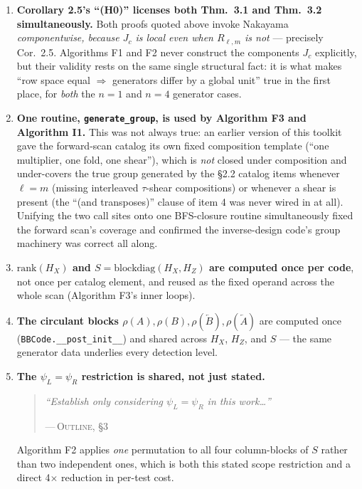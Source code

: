 \documentclass[11pt]{article}
\theoremstyle{plain}
\theoremstyle{definition}
\newenvironment{paperquote}[1]{%
  \def\paperquotecite{#1}%
  \begin{quotation}\noindent\itshape\small
}{%
  \normalfont\par\hfill---\,\textsc{Outline}, \paperquotecite\medskip
  \end{quotation}
}
\newcommand{\pq}[2]{\begin{paperquote}{#1}#2\end{paperquote}}
\begin{document}
\begin{enumerate}[leftmargin=*]

\item \textbf{Corollary 2.5's ``(H0)'' licenses both Thm.\ 3.1 and Thm.\
3.2 simultaneously.} Both proofs quoted above invoke Nakayama
\emph{componentwise, because $J_c$ is local even when $R_{\ell,m}$ is not}
--- precisely Cor.\ 2.5. Algorithms F1 and F2 never construct the
components $J_c$ explicitly, but their validity rests on the same single
structural fact: it is what makes ``row space equal $\Rightarrow$ generators
differ by a global unit'' true in the first place, for \emph{both} the
$n=1$ and $n=4$ generator cases.

\item \textbf{One routine, \texttt{generate\_group}, is used by Algorithm
F3 and Algorithm I1.} This was not always true: an earlier version of this
toolkit gave the forward-scan catalog its own fixed composition template
(``one multiplier, one fold, one shear''), which is \emph{not} closed under
composition and under-covers the true group generated by the \S2.2 catalog
items whenever $\ell=m$ (missing interleaved $\tau$-shear compositions) or
whenever a shear is present (the ``(and transposes)'' clause of item 4 was
never wired in at all). Unifying the two call sites onto one BFS-closure
routine simultaneously fixed the forward scan's coverage and confirmed the
inverse-design code's group machinery was correct all along.

\item \textbf{$\mathrm{rank}(H_X)$ and $S=\mathrm{blockdiag}(H_X,H_Z)$ are
computed once per code}, not once per catalog element, and reused as the
fixed operand across the whole scan (Algorithm F3's inner loops).

\item \textbf{The circulant blocks $\rho(A),\rho(B),\rho(\overleftarrow{B}),
\rho(\overleftarrow{A})$} are computed once (\texttt{BBCode.\_\_post\_init\_\_})
and shared across $H_X$, $H_Z$, and $S$ --- the same generator data
underlies every detection level.

\item \textbf{The $\psi_L=\psi_R$ restriction is shared, not just stated.}
\pq{\S3}{``Establish only considering $\psi_L=\psi_R$ in this work\ldots''}
Algorithm F2 applies \emph{one} permutation to all four column-blocks of
$S$ rather than two independent ones, which is both this stated scope
restriction and a direct 4$\times$ reduction in per-test cost.

\end{enumerate}
\end{document}
